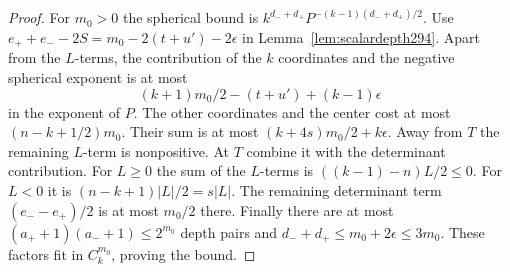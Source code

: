 \documentclass[a4paper,11pt]{article}
\theoremstyle{definition}
\theoremstyle{remark}
\numberwithin{equation}{section}
\begin{document}
\begin{proof}
For \(m_0>0\) the spherical bound is
\(k^{d_-+d_+}P^{-(k-1)(d_-+d_+)/2}\).
Use \(e_++e_--2S=m_0-2(t+u')-2\epsilon\)
in Lemma~\ref{lem:scalardepth294}. Apart from the
\(L\)-terms, the contribution of the \(k\) coordinates
and the negative spherical exponent is at most
\[
       (k+1)m_0/2-(t+u')+(k-1)\epsilon
\]
in the exponent of \(P\). The other coordinates and
the center cost at most \((n-k+1/2)m_0\). Their sum is at
most \((k+4s)m_0/2+k\epsilon\). Away from \(T\) the
remaining \(L\)-term is nonpositive. At \(T\) combine it
with the determinant contribution. For \(L\ge0\) the sum
of the \(L\)-terms is \(((k-1)-n)L/2\le0\). For \(L<0\)
it is \((n-k+1)|L|/2=s|L|\). The remaining determinant
term \((e_--e_+)/2\) is at most \(m_0/2\) there.
Finally there are at most
\((a_++1)(a_-+1)\le2^{m_0}\) depth pairs and
\(d_-+d_+\le m_0+2\epsilon\le3m_0\).
These factors fit in \(C_k^{m_0}\), proving the bound.
\end{proof}
\end{document}
